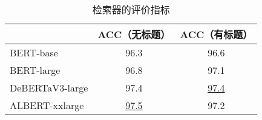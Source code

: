 \begin{table}[htbp]
    \centering
    \caption{检索器的评价指标}
    \begin{tabular}{lcc}
    \hline
    & ACC（无标题） & ACC（有标题） \\
    \hline
    BERT-base & 96.3 & 96.6 \\
    BERT-large & 96.8 & 97.1 \\
    DeBERTaV3-large & 97.4 & \underline{97.4} \\
    ALBERT-xxlarge & \underline{97.5} & 97.2 \\
    \hline
    \end{tabular}
    \label{tab:5-5}
\end{table}
